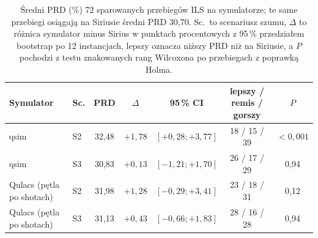 \begin{table}[t]
\caption{Średni PRD (\%) 72 sparowanych przebiegów ILS na symulatorze; te same przebiegi osiągają na Siriusie średni PRD 30,70. Sc.\ to scenariusz szumu, $\Delta$ to różnica symulator minus Sirius w punktach procentowych z 95\,\% przedziałem bootstrap po 12 instancjach, lepszy oznacza niższy PRD niż na Siriusie, a $P$ pochodzi z testu znakowanych rang Wilcoxona po przebiegach z poprawką Holma.}
\label{tab:t5}
\centering
\small
\setlength{\tabcolsep}{4pt}
\begin{tabular}{llccccc}
\toprule
Symulator & Sc. & PRD & $\Delta$ & 95\,\% CI & lepszy / remis / gorszy & $P$ \\
\midrule
qsim & S2 & 32,48 & $+1{,}78$ & $[+0{,}28; +3{,}77]$ & 18 / 15 / 39 & $<0{,}001$ \\
qsim & S3 & 30,83 & $+0{,}13$ & $[-1{,}21; +1{,}70]$ & 26 / 17 / 29 & 0,94 \\
Qulacs (pętla po shotach) & S2 & 31,98 & $+1{,}28$ & $[-0{,}29; +3{,}41]$ & 23 / 18 / 31 & 0,12 \\
Qulacs (pętla po shotach) & S3 & 31,13 & $+0{,}43$ & $[-0{,}66; +1{,}83]$ & 28 / 16 / 28 & 0,94 \\
\bottomrule
\end{tabular}
\end{table}
